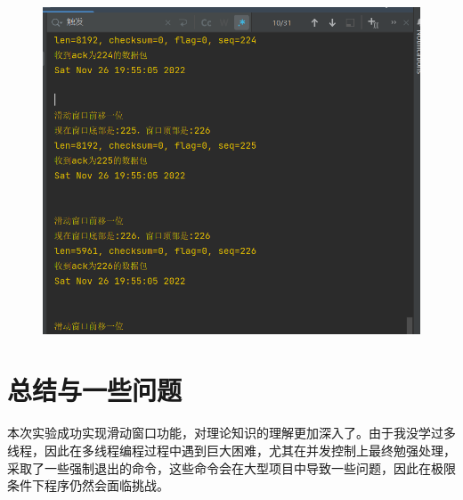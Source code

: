 \documentclass[UTF8,a4paper,10pt]{ctexart}
\begin{document}
\begin{figure}[H]
    \centering
    \includegraphics[scale=0.6]{G网6.png}
    \label{fig:11}
\end{figure}
\section{总结与一些问题}
本次实验成功实现滑动窗口功能，对理论知识的理解更加深入了。由于我没学过多线程，因此在多线程编程过程中遇到巨大困难，尤其在并发控制上最终勉强处理，采取了一些强制退出的命令，这些命令会在大型项目中导致一些问题，因此在极限条件下程序仍然会面临挑战。
\end{document}
